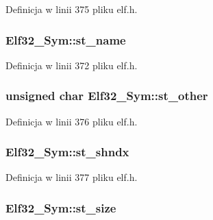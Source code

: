Definicja w linii 375 pliku elf.\-h.

\hypertarget{struct_elf32___sym_a6a972b30868879f8a1e071e0c45e5031}{
\subsubsection[{st\-\_\-name}]{ Elf32\-\_\-\-Sym\-::st\-\_\-name}}\label{struct_elf32___sym_a6a972b30868879f8a1e071e0c45e5031}


Definicja w linii 372 pliku elf.\-h.

\hypertarget{struct_elf32___sym_a2e1bf6bedb5180f74ea8cbaf9cedfd36}{
\subsubsection[{st\-\_\-other}]{\setlength{\rightskip}{0pt plus 5cm}unsigned char Elf32\-\_\-\-Sym\-::st\-\_\-other}}\label{struct_elf32___sym_a2e1bf6bedb5180f74ea8cbaf9cedfd36}


Definicja w linii 376 pliku elf.\-h.

\hypertarget{struct_elf32___sym_abfa99b2ee1f5f6dbc5d5d348e753a7cb}{
\subsubsection[{st\-\_\-shndx}]{ Elf32\-\_\-\-Sym\-::st\-\_\-shndx}}\label{struct_elf32___sym_abfa99b2ee1f5f6dbc5d5d348e753a7cb}


Definicja w linii 377 pliku elf.\-h.

\hypertarget{struct_elf32___sym_a1b410e69fecd2610bc7e58d2b0245053}{
\subsubsection[{st\-\_\-size}]{ Elf32\-\_\-\-Sym\-::st\-\_\-size}}\label{struct_elf32___sym_a1b410e69fecd2610bc7e58d2b0245053}


